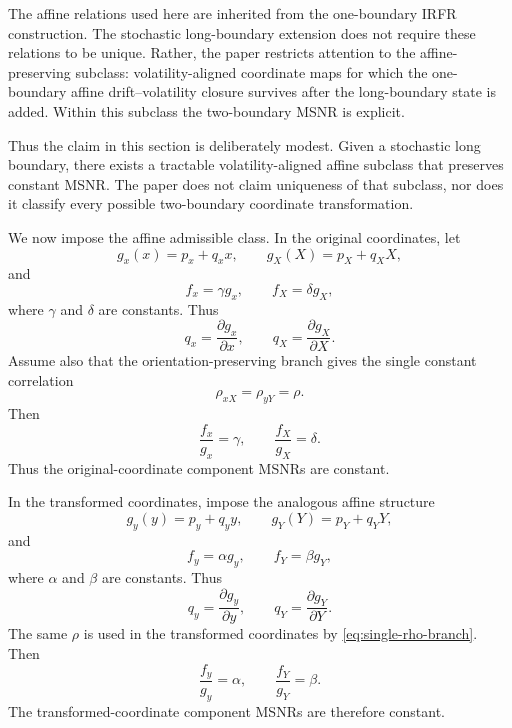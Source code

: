 \documentclass[11pt]{article}
\numberwithin{equation}{section}
\begin{document}
The affine relations used here are inherited from the one-boundary IRFR construction. The stochastic long-boundary extension does not require these relations to be unique. Rather, the paper restricts attention to the affine-preserving subclass: volatility-aligned coordinate maps for which the one-boundary affine drift--volatility closure survives after the long-boundary state is added. Within this subclass the two-boundary MSNR is explicit.

Thus the claim in this section is deliberately modest. Given a stochastic long boundary, there exists a tractable volatility-aligned affine subclass that preserves constant MSNR. The paper does not claim uniqueness of that subclass, nor does it classify every possible two-boundary coordinate transformation.

We now impose the affine admissible class. In the original coordinates, let
\begin{equation}
\label{eq:old-affine-g}
g_x(x)=p_x+q_xx,
\qquad
g_X(X)=p_X+q_XX,
\end{equation}
and
\begin{equation}
\label{eq:old-affine-f}
f_x=\gamma g_x,
\qquad
f_X=\delta g_X,
\end{equation}
where \(\gamma\) and \(\delta\) are constants. Thus
\[
q_x=\frac{\partial g_x}{\partial x},
\qquad
q_X=\frac{\partial g_X}{\partial X}.
\] Assume also that the orientation-preserving branch gives the single constant correlation
\[
\rho_{xX}=\rho_{yY}=\rho.
\]
Then
\[
\frac{f_x}{g_x}=\gamma,
\qquad
\frac{f_X}{g_X}=\delta.
\]
Thus the original-coordinate component MSNRs are constant.

In the transformed coordinates, impose the analogous affine structure
\begin{equation}
\label{eq:new-affine-g}
g_y(y)=p_y+q_yy,
\qquad
g_Y(Y)=p_Y+q_YY,
\end{equation}
and
\begin{equation}
\label{eq:new-affine-f}
f_y=\alpha g_y,
\qquad
f_Y=\beta g_Y,
\end{equation}
where \(\alpha\) and \(\beta\) are constants. Thus
\[
q_y=\frac{\partial g_y}{\partial y},
\qquad
q_Y=\frac{\partial g_Y}{\partial Y}.
\] The same \(\rho\) is used in the transformed coordinates by \eqref{eq:single-rho-branch}.
Then
\begin{equation}
\label{eq:component-MSNRs}
\frac{f_y}{g_y}=\alpha,
\qquad
\frac{f_Y}{g_Y}=\beta.
\end{equation}
The transformed-coordinate component MSNRs are therefore constant.
\end{document}
